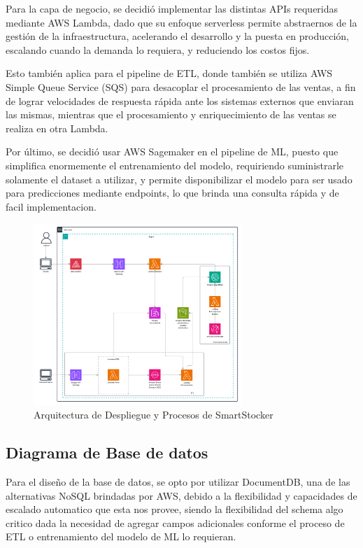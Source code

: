 Para la capa de negocio, se decidió implementar las distintas APIs requeridas mediante AWS Lambda, dado que su enfoque serverless permite abstraernos de la gestión de la infraestructura, acelerando el desarrollo y la puesta en producción, escalando cuando la demanda lo requiera, y reduciendo los costos fijos.

Esto también aplica para el pipeline de ETL, donde también se utiliza AWS Simple Queue Service (SQS) para desacoplar el procesamiento de las ventas, a fin de lograr velocidades de respuesta rápida ante los sistemas externos que enviaran las mismas, mientras que el procesamiento y enriquecimiento de las ventas se realiza en otra Lambda.

Por último, se decidió usar AWS Sagemaker en el pipeline de ML, puesto que simplifica enormemente el entrenamiento del modelo, requiriendo suministrarle solamente el dataset a utilizar, y permite disponibilizar el modelo para ser usado para predicciones mediante endpoints, lo que brinda una consulta rápida y de facil implementacion.

\begin{figure}[htbp]
    \centering
    \includegraphics[width=0.7\textwidth]{images/arquitectura_despliegue.png}
    \caption{Arquitectura de Despliegue y Procesos de SmartStocker}
    \label{fig:arquitectura-despliegue}
\end{figure}

\subsection{Diagrama de Base de datos}\label{sec:arquitectura-base-datos}

Para el diseño de la base de datos, se opto por utilizar DocumentDB, una de las alternativas NoSQL brindadas por AWS, debido a la flexibilidad y capacidades de escalado automatico que esta nos provee, siendo la flexibilidad del schema algo critico dada la necesidad de agregar campos adicionales conforme el proceso de ETL o entrenamiento del modelo de ML lo requieran.

